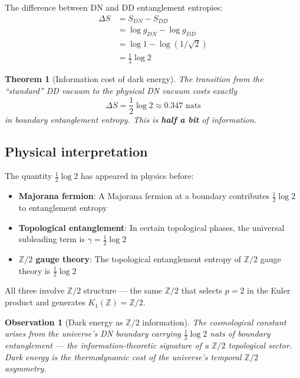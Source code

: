 \documentclass[11pt,a4paper]{article}
\newtheorem{theorem}{Theorem}
\newtheorem{observation}{Observation}
\begin{document}
The difference between DN and DD entanglement entropies:
\begin{align}
\Delta S &= S_{DN} - S_{DD} \\
&= \log g_{DN} - \log g_{DD} \\
&= \log 1 - \log(1/\sqrt{2}) \\
&= \frac{1}{2}\log 2
\end{align}

\begin{theorem}[Information cost of dark energy]
\label{th:info-cost}
The transition from the ``standard'' DD vacuum to the physical
DN vacuum costs exactly
\begin{equation}
\boxed{\Delta S = \frac{1}{2}\log 2 \approx 0.347 \text{ nats}}
\end{equation}
in boundary entanglement entropy. This is \textbf{half a bit} of
information.
\end{theorem}

\subsection{Physical interpretation}

The quantity $\frac{1}{2}\log 2$ has appeared in physics before:
\begin{itemize}
\item \textbf{Majorana fermion}: A Majorana fermion at a boundary
contributes $\frac{1}{2}\log 2$ to entanglement
entropy~\cite{Kitaev2006}
\item \textbf{Topological entanglement}: In certain topological
phases, the universal subleading term is $\gamma = \frac{1}{2}\log 2$
\item \textbf{$\mathbb{Z}/2$ gauge theory}: The topological
entanglement entropy of $\mathbb{Z}/2$ gauge theory is
$\frac{1}{2}\log 2$
\end{itemize}

All three involve $\mathbb{Z}/2$ structure --- the same
$\mathbb{Z}/2$ that selects $p = 2$ in the Euler product and
generates $K_1(\mathbb{Z}) = \mathbb{Z}/2$.

\begin{observation}[Dark energy as $\mathbb{Z}/2$ information]
The cosmological constant arises from the universe's DN boundary
carrying $\frac{1}{2}\log 2$ nats of boundary entanglement ---
the information-theoretic signature of a $\mathbb{Z}/2$ topological
sector. Dark energy is the \emph{thermodynamic cost of the
universe's temporal $\mathbb{Z}/2$ asymmetry}.
\end{observation}
\end{document}
